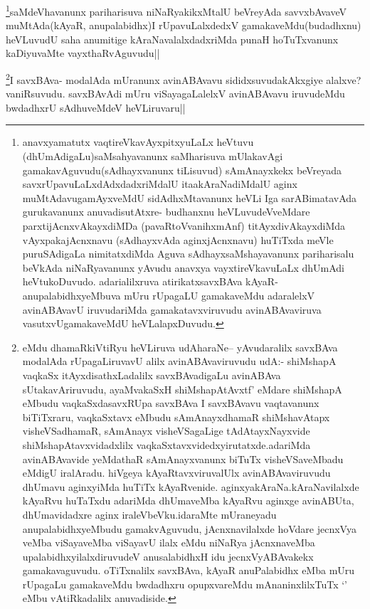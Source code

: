 \begin{artha}
\footnote{anavxyamatutx vaqtireVkavAyxpitxyuLaLx heVtuvu (dhUmAdigaLu)saMsahyavanunx saMharisuva mUlakavAgi gamakavAguvudu(sAdhayxvanunx tiLisuvud) sAmAnayxkekx beVreyada savxrUpavuLaLxdAdxdadxriMdalU itaakAraNadiMdalU aginx muMtAdavugamAyxveMdU sidAdhxMtavanunx heVLi Iga sarABimatavAda gurukavanunx anuvadisutAtxre- budhanxnu heVLuvudeVveMdare parxtijAcnxvAkayxdiMDa (pavaRtoVvanihxmAnf) titAyxdivAkayxdiMda vAyxpakajAcnxnavu (sAdhayxvAda aginxjAcnxnavu) huTiTxda meVle puruSAdigaLa nimitatxdiMda Aguva sAdhayxsaMshayavanunx pariharisalu beVkAda niNaRyavanunx yAvudu anavxya vayxtireVkavuLaLx dhUmAdi heVtukoDuvudo. adarialilxruva atirikatxsavxBAva kAyaR- anupalabidhxyeMbuva mUru rUpagaLU gamakaveMdu adaralelxV avinABAvavU iruvudariMda gamakatavxviruvudu avinABAvaviruva vasutxvUgamakaveMdU heVLalapxDuvudu.}saMdeVhavanunx pariharisuva niNaRyakikxMtalU beVreyAda savvxbAvaveV  muMtAda(kAyaR, anupalabidhx)I rUpavuLalxdedxV gamakaveMdu(budadhxnu) heVLuvudU saha anumitige kAraNavalalxdadxriMda punaH hoTuTxvanunx kaDiyuvaMte vayxthaRvAguvudu||
\end{artha}


\begin{artha}
\footnote{\stext \stext  eMdu dhamaRkiVtiRyu heVLiruva udAharaNe-- yAvudaralilx savxBAva modalAda rUpagaLiruvavU alilx avinABAvaviruvudu udA:- shiMshapA vaqkaSx itAyxdisathxLadalilx savxBAvadigaLu avinABAva sUtakavAriruvudu, ayaMvakaSxH shiMshapAtAvxtf' eMdare shiMshapA eMbudu vaqkaSxdasavxRUpa savxBAva I savxBAvavu vaqtavanunx biTiTxraru, vaqkaSxtavx eMbudu sAmAnayxdhamaR shiMshavAtapx visheVSadhamaR, sAmAnayx visheVSagaLige tAdAtayxNayxvide shiMshapAtavxvidadxlilx vaqkaSxtavxvidedxyirutatxde.adariMda avinABAvavide yeMdathaR sAmAnayxvanunx biTuTx visheVSaveMbadu eMdigU iralAradu. hiVgeya kAyaRtavxviruvalUlx avinABAvaviruvudu dhUmavu aginxyiMda huTiTx kAyaRvenide. aginxyakAraNa.kAraNavilalxde kAyaRvu huTaTxdu adariMda dhUmaveMba kAyaRvu aginxge avinABUta, dhUmavidadxre aginx iraleVbeVku.idaraMte mUraneyadu anupalabidhxyeMbudu gamakvAguvudu, jAcnxnavilalxde hoVdare jecnxVya veMba viSayaveMba viSayavU ilalx eMdu niNaRya jAcnxnaveMba upalabidhxyilalxdiruvudeV anusalabidhxH idu jecnxVyABAvakekx gamakavaguvudu. oTiTxnalilx savxBAva, kAyaR anuPalabidhx eMba mUru rUpagaLu gamakaveMdu bwdadhxru opupxvareMdu mAnaninxlilxTuTx `\stext' eMbu vAtiRkadalilx anuvadiside.}I savxBAva- modalAda mUranunx avinABAvavu sididxsuvudakAkxgiye alalxve? vaniRsuvudu. savxBAvAdi mUru viSayagaLalelxV avinABAvavu iruvudeMdu bwdadhxrU sAdhuveMdeV heVLiruvaru||
\end{artha}

